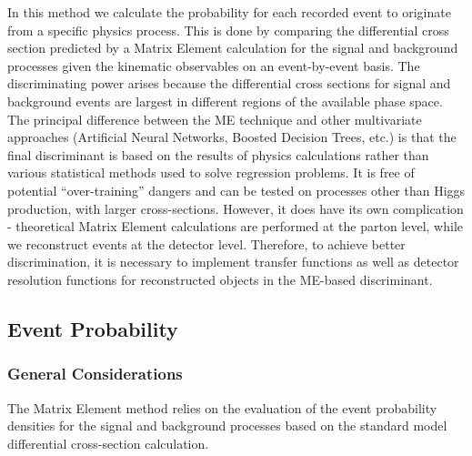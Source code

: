 \documentclass{cmspaper}
\begin{document}
In this method we calculate the probability for each recorded event to originate from a specific physics process.  
This is done by comparing the differential cross section predicted by a Matrix Element calculation for the signal and background processes given the kinematic observables
on an event-by-event basis. The discriminating power arises because the differential cross sections for signal and background
events are largest in different regions of the available phase space. The principal difference between the ME technique and other
multivariate approaches (Artificial Neural Networks, Boosted Decision Trees, etc.) is that the final discriminant is based on the results
of physics calculations rather than various statistical methods used to solve regression problems. It is free of potential ``over-training''
dangers and can be tested on processes other than Higgs production, with larger cross-sections. However, it does have its own complication - 
theoretical Matrix Element calculations are performed at the parton level, while we reconstruct events at the detector level. 
Therefore, to achieve better discrimination, it is necessary to implement transfer functions as well as detector resolution functions for
reconstructed objects in the ME-based discriminant.

\subsection{Event Probability}
\label{sec:Evt_Prob}
\subsubsection{General Considerations}
The Matrix Element method relies on the evaluation of the event probability densities for the signal and background processes based on the 
standard model differential cross-section calculation. 
\end{document}
